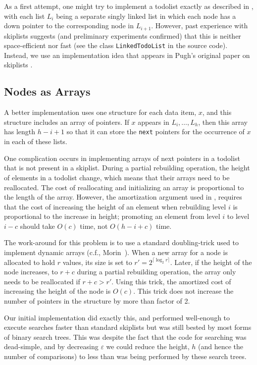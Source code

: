 \documentclass[lotsofwhite]{patmorin}
\newcommand{\eps}{\varepsilon}
\begin{document}
As a first attempt, one might try to implement a todolist exactly
as described in , with each list $L_i$ being a
separate singly linked list in which each node has a down pointer to
the corresponding node in $L_{i+1}$.  However, past experience with
skiplists suggests (and preliminary experiments confirmed) that this is
neither space-efficient nor fast (see the class \texttt{LinkedTodoList}
in the source code). Instead, we use an implementation idea that appears in
Pugh's original paper on skiplists \cite{pugh:skip}.

\subsection{Nodes as Arrays}

A better implementation uses one structure for each data item, $x$,
and this structure includes an array of pointers.  If $x$ appears in
$L_{i},\ldots,L_h$, then this array has length $h-i+1$ so that it can
store the \texttt{next} pointers for the occurrence of $x$ in each of
these lists.  

One complication occurs in implementing arrays of next pointers in a
todolist that is not present in a skiplist.  During a partial rebuilding
operation, the height of elements in a todolist change, which means
that their arrays need to be reallocated.  The cost of reallocating and
initializing an array is proportional to the length of the array. However,
the amortization argument used in , requires that the
cost of increasing the height of an element when rebuilding level $i$
is proportional to the increase in height; promoting an element from
level $i$ to level $i-c$ should take $O(c)$ time, not $O(h - i + c)$ time.

The work-around for this problem is to use a standard
doubling-trick used to implement dynamic arrays (c.f.,
Morin~\cite[Section~2.1.2]{morin:open}). When a new array for a node
is allocated to hold $r$ values, its size is set to $r'=2^{\lceil\log_2
r\rceil}$.  Later, if the height of the node increases, to $r+c$ during
a partial rebuilding operation, the array only needs to be reallocated
if $r+c > r'$.  Using this trick, the amortized
cost of increasing the height of the node is $O(c)$.  This trick does not
increase the number of pointers in the structure by more than factor of 2.

Our initial implementation did exactly this, and performed well-enough
to execute searches faster than standard skiplists but was still bested
by most forms of binary search trees.  This was despite the fact that
the code for searching was dead-simple, and by decreasing $\eps$ we
could reduce the height, $h$ (and hence the number of comparisons)
to less than was being performed by these search trees.
\end{document}

